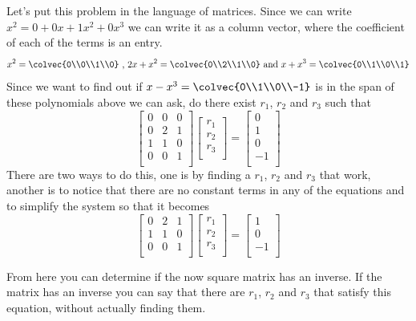 {Let's put this problem in the language of matrices. Since we can write $x^2 = 0 + 0x+1x^2 +0x^3$ we can write it as a column vector, where the coefficient of each of the terms is an entry.
\[
x^2 =\colvec{0\\0\\1\\0} \text{ , } 2x+x^2 =\colvec{0\\2\\1\\0} \text{ and }
x+x^3 =\colvec{0\\1\\0\\1}
 \]
Since we want to find out if $x-x^3 =\colvec{0\\1\\0\\-1}$ is in the span of these polynomials above we can ask, do there exist $r_1$, $r_2$ and $r_3$ such that 
\[
\begin{bmatrix}
0& 0& 0\\
0& 2& 1\\
1& 1& 0\\
0& 0& 1\\
\end{bmatrix}
\begin{bmatrix}
r_1\\
r_2\\
r_3\\
\end{bmatrix}
= 
\begin{bmatrix}
0\\
1\\
0\\
-1\\
\end{bmatrix}
\]
There are two ways to do this, one is by finding a $r_1$, $r_2$ and $r_3$ that work, another is to notice that there are no constant terms in any of the equations and to simplify the system so that it becomes
\[
\begin{bmatrix}
0& 2& 1\\
1& 1& 0\\
0& 0& 1\\
\end{bmatrix}
\begin{bmatrix}
r_1\\
r_2\\
r_3\\
\end{bmatrix}
= 
\begin{bmatrix}
1\\
0\\
-1\\
\end{bmatrix}
\]

From here you can determine if the now square matrix has an inverse. If the matrix has an inverse you can say that there are $r_1$, $r_2$ and $r_3$ that satisfy this equation, without actually finding them.
} %

\newpage

